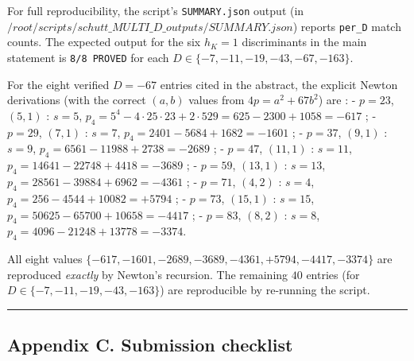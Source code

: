 \documentclass[
  11pt,
  a4paper,
]{amsart}
\begin{document}
For full reproducibility, the script's \texttt{SUMMARY.json} output (in \(/root/scripts/schutt\_MULTI\_D\_outputs/SUMMARY.json\)) reports \texttt{per\_D} match counts. The expected output for the six \(h_K = 1\) discriminants in the main statement is \texttt{8/8\ PROVED} for each \(D \in \{-7, -11, -19, -43, -67, -163\}\).

For the eight verified \(D = -67\) entries cited in the abstract, the explicit Newton derivations (with the correct \((a, b)\) values from \(4 p = a^2 + 67 b^2\)) are :
- \(p = 23\), \((5, 1)\) : \(s = 5\), \(p_4 = 5^4 - 4 \cdot 25 \cdot 23 + 2 \cdot 529 = 625 - 2300 + 1058 = -617\) ;
- \(p = 29\), \((7, 1)\) : \(s = 7\), \(p_4 = 2401 - 5684 + 1682 = -1601\) ;
- \(p = 37\), \((9, 1)\) : \(s = 9\), \(p_4 = 6561 - 11988 + 2738 = -2689\) ;
- \(p = 47\), \((11, 1)\) : \(s = 11\), \(p_4 = 14641 - 22748 + 4418 = -3689\) ;
- \(p = 59\), \((13, 1)\) : \(s = 13\), \(p_4 = 28561 - 39884 + 6962 = -4361\) ;
- \(p = 71\), \((4, 2)\) : \(s = 4\), \(p_4 = 256 - 4544 + 10082 = +5794\) ;
- \(p = 73\), \((15, 1)\) : \(s = 15\), \(p_4 = 50625 - 65700 + 10658 = -4417\) ;
- \(p = 83\), \((8, 2)\) : \(s = 8\), \(p_4 = 4096 - 21248 + 13778 = -3374\).

All eight values \(\{-617, -1601, -2689, -3689, -4361, +5794, -4417, -3374\}\) are reproduced \emph{exactly} by Newton's recursion. The remaining \(40\) entries (for \(D \in \{-7, -11, -19, -43, -163\}\)) are reproducible by re-running the script.

\begin{center}\rule{0.5\linewidth}{0.5pt}\end{center}

\hypertarget{appendix-c.-submission-checklist}{%
\subsection{Appendix C. Submission checklist}\label{appendix-c.-submission-checklist}}
\end{document}

